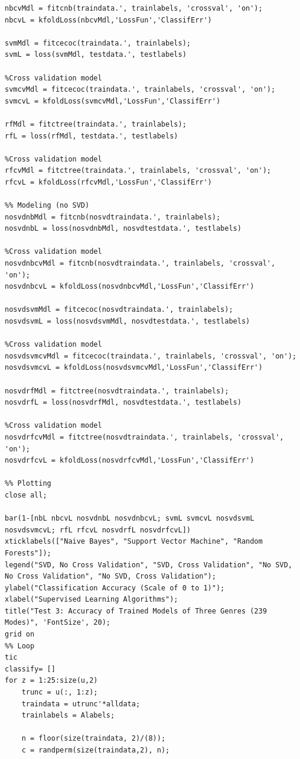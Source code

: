 \documentclass{article}
\begin{document}
\begin{lstlisting}[style=Matlab-editor]
%Cross validation model
nbcvMdl = fitcnb(traindata.', trainlabels, 'crossval', 'on');
nbcvL = kfoldLoss(nbcvMdl,'LossFun','ClassifErr')

svmMdl = fitcecoc(traindata.', trainlabels);
svmL = loss(svmMdl, testdata.', testlabels)

%Cross validation model
svmcvMdl = fitcecoc(traindata.', trainlabels, 'crossval', 'on');
svmcvL = kfoldLoss(svmcvMdl,'LossFun','ClassifErr')

rfMdl = fitctree(traindata.', trainlabels);
rfL = loss(rfMdl, testdata.', testlabels)

%Cross validation model
rfcvMdl = fitctree(traindata.', trainlabels, 'crossval', 'on');
rfcvL = kfoldLoss(rfcvMdl,'LossFun','ClassifErr')

%% Modeling (no SVD)
nosvdnbMdl = fitcnb(nosvdtraindata.', trainlabels);
nosvdnbL = loss(nosvdnbMdl, nosvdtestdata.', testlabels)

%Cross validation model
nosvdnbcvMdl = fitcnb(nosvdtraindata.', trainlabels, 'crossval', 'on');
nosvdnbcvL = kfoldLoss(nosvdnbcvMdl,'LossFun','ClassifErr')

nosvdsvmMdl = fitcecoc(nosvdtraindata.', trainlabels);
nosvdsvmL = loss(nosvdsvmMdl, nosvdtestdata.', testlabels)

%Cross validation model
nosvdsvmcvMdl = fitcecoc(traindata.', trainlabels, 'crossval', 'on');
nosvdsvmcvL = kfoldLoss(nosvdsvmcvMdl,'LossFun','ClassifErr')

nosvdrfMdl = fitctree(nosvdtraindata.', trainlabels);
nosvdrfL = loss(nosvdrfMdl, nosvdtestdata.', testlabels)

%Cross validation model
nosvdrfcvMdl = fitctree(nosvdtraindata.', trainlabels, 'crossval', 'on');
nosvdrfcvL = kfoldLoss(nosvdrfcvMdl,'LossFun','ClassifErr')

%% Plotting
close all;

bar(1-[nbL nbcvL nosvdnbL nosvdnbcvL; svmL svmcvL nosvdsvmL nosvdsvmcvL; rfL rfcvL nosvdrfL nosvdrfcvL])
xticklabels(["Naive Bayes", "Support Vector Machine", "Random Forests"]);
legend("SVD, No Cross Validation", "SVD, Cross Validation", "No SVD, No Cross Validation", "No SVD, Cross Validation");
ylabel("Classification Accuracy (Scale of 0 to 1)"); xlabel("Supervised Learning Algorithms");
title("Test 3: Accuracy of Trained Models of Three Genres (239 Modes)", 'FontSize', 20);
grid on
%% Loop
tic
classify= []
for z = 1:25:size(u,2)
    trunc = u(:, 1:z);
    traindata = utrunc'*alldata;
    trainlabels = Alabels;
    
    n = floor(size(traindata, 2)/(8));
    c = randperm(size(traindata,2), n);
    

\end{lstlisting}
\end{document}

